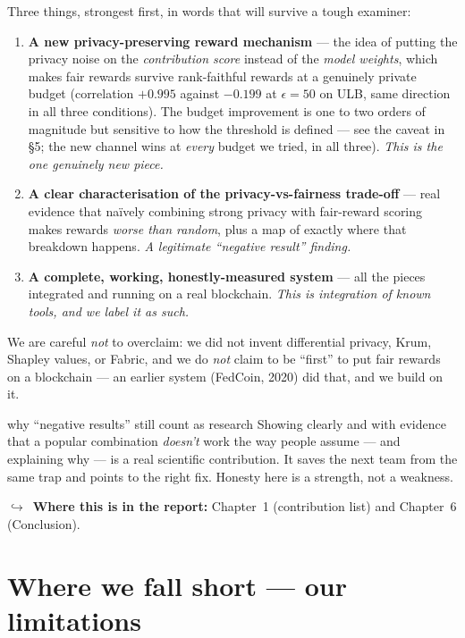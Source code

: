 \documentclass[11pt]{article}
\newcommand{\reportnote}[1]{%
  \par\vspace{3pt}%
  {\small\color{soft}$\hookrightarrow$\ \textbf{Where this is in the report:} #1}\par\vspace{2pt}}
\begin{document}
Three things, strongest first, in words that will survive a tough examiner:

\begin{enumerate}
  \item \textbf{A new privacy-preserving reward mechanism} --- the idea of putting the privacy noise on
  the \emph{contribution score} instead of the \emph{model weights}, which makes fair rewards survive
  rank-faithful rewards at a genuinely private budget (correlation $+0.995$ against $-0.199$ at
  $\epsilon=50$ on ULB, same direction in all three conditions). The budget improvement is one to two
  orders of magnitude but sensitive to how the threshold is defined --- see the caveat in \S5; the new
  channel
  wins at \emph{every} budget we tried, in all three). \emph{This is the one genuinely new piece.}
  \item \textbf{A clear characterisation of the privacy-vs-fairness trade-off} --- real evidence that
  naïvely combining strong privacy with fair-reward scoring makes rewards \emph{worse than random}, plus
  a map of exactly where that breakdown happens. \emph{A legitimate ``negative result'' finding.}
  \item \textbf{A complete, working, honestly-measured system} --- all the pieces integrated and running
  on a real blockchain. \emph{This is integration of known tools, and we label it as such.}
\end{enumerate}

We are careful \emph{not} to overclaim: we did not invent differential privacy, Krum, Shapley values, or
Fabric, and we do \emph{not} claim to be ``first'' to put fair rewards on a blockchain --- an earlier
system (FedCoin, 2020) did that, and we build on it.

\begin{plain}{why ``negative results'' still count as research}
Showing clearly and with evidence that a popular combination \emph{doesn't} work the way people assume
--- and explaining why --- is a real scientific contribution. It saves the next team from the same trap
and points to the right fix. Honesty here is a strength, not a weakness.
\end{plain}

\reportnote{Chapter~1 (contribution list) and Chapter~6 (Conclusion).}

\section{Where we fall short --- our limitations}
\end{document}
